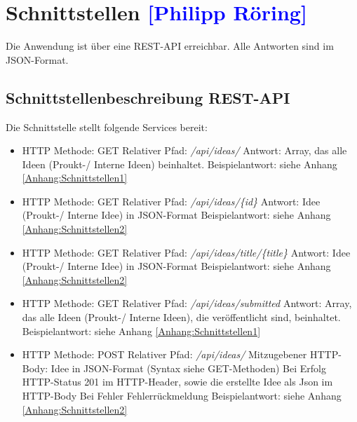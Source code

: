 

\section{Schnittstellen \textcolor{blue}{[Philipp Röring]}}

Die Anwendung ist über eine REST-API erreichbar. Alle Antworten sind im JSON-Format.

\subsection{Schnittstellenbeschreibung REST-API}
Die Schnittstelle stellt folgende Services bereit:
\begin{itemize}
    \item HTTP Methode: GET
    \subitem Relativer Pfad: \textit{/api/ideas/}
    \subitem Antwort: Array, das alle Ideen (Proukt-/ Interne Ideen) beinhaltet.
    \subitem Beispielantwort: siehe Anhang \ref{Anhang:Schnittstellen1}
\end{itemize}

\begin{itemize}
    \item HTTP Methode: GET
    \subitem Relativer Pfad: \textit{/api/ideas/\{id\}}
    \subitem Antwort: Idee (Proukt-/ Interne Idee) in JSON-Format
    \subitem Beispielantwort: siehe Anhang \ref{Anhang:Schnittstellen2}
\end{itemize}

\begin{itemize}
    \item HTTP Methode: GET
    \subitem Relativer Pfad: \textit{/api/ideas/title/\{title\}}
    \subitem Antwort: Idee (Proukt-/ Interne Idee) in JSON-Format
    \subitem Beispielantwort: siehe Anhang \ref{Anhang:Schnittstellen2}
\end{itemize}

\begin{itemize}
    \item HTTP Methode: GET
    \subitem Relativer Pfad: \textit{/api/ideas/submitted}
    \subitem Antwort: Array, das alle Ideen (Proukt-/ Interne Ideen), die veröffentlicht sind, beinhaltet.
    \subitem Beispielantwort: siehe Anhang \ref{Anhang:Schnittstellen1}
\end{itemize}

\begin{itemize}
    \item HTTP Methode: POST
    \subitem Relativer Pfad: \textit{/api/ideas/}
    \subitem Mitzugebener HTTP-Body: Idee in JSON-Format (Syntax siehe GET-Methoden)
    \subitem Bei Erfolg
    \subsubitem HTTP-Status 201 im HTTP-Header, sowie die erstellte Idee als Json im HTTP-Body
    \subitem Bei Fehler
    \subsubitem Fehlerrückmeldung
    \subitem Beispielantwort: siehe Anhang \ref{Anhang:Schnittstellen2}
\end{itemize}

